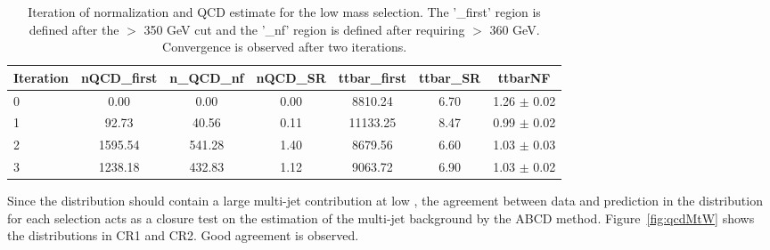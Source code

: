 \begin{center}
\begin{table}[h!]%
  \begin{tabular}{l|c|c|c|c|c|c}
    \hline\hline
    Iteration &      nQCD\_first &   n\_QCD\_nf &    nQCD\_SR &      ttbar\_first &           ttbar\_SR &     ttbarNF       \\\hline
    0        &       0.00 &          0.00 &          0.00 &          8810.24 &       6.70 &          1.26 $\pm$ 0.02        \\\hline
    1        &       92.73 &         40.56 &         0.11 &          11133.25 &      8.47 &          0.99 $\pm$ 0.02        \\\hline
    2        &       1595.54 &       541.28 &        1.40 &          8679.56 &       6.60 &          1.03 $\pm$ 0.03        \\\hline
    3        &       1238.18 &       432.83 &        1.12 &          9063.72 &       6.90 &          1.03 $\pm$ 0.02        \\\hline
    \hline
  \end{tabular}
\caption{Iteration of \ttbar normalization and QCD estimate for the low mass selection. The '\_first' region is defined after the \ptbb $>$ 350 GeV cut and the '\_nf' region is defined after requiring \ptww $>$ 360 GeV. Convergence is observed after two iterations.}
\end{table}
\label{tab:ttbarQCDiter_high}
\end{center}

Since the \mtw distribution should contain a large multi-jet contribution at low \mtw, the agreement between data and prediction in the \mtw distribution for each selection acts as a closure test on the estimation of the multi-jet background by the ABCD method. Figure~\ref{fig:qcdMtW} shows the \mtw distributions in CR1 and CR2. Good agreement is observed.

